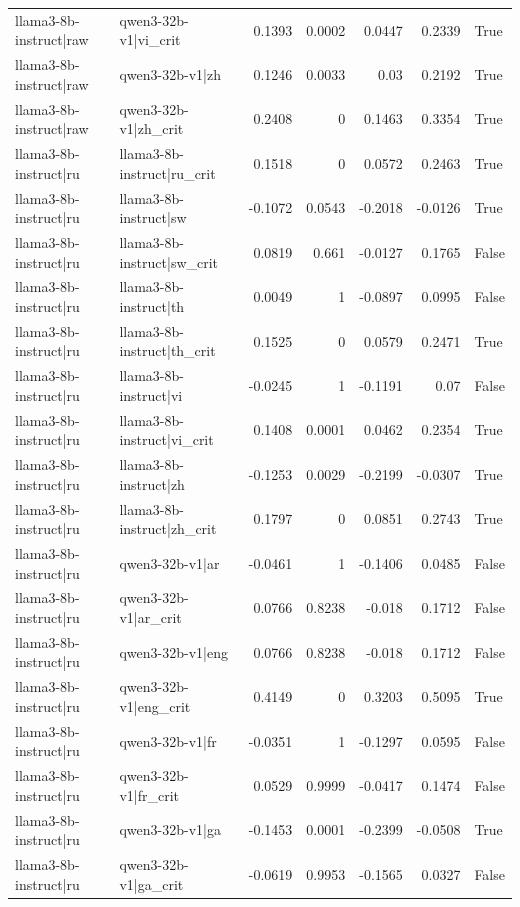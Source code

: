 \begin{table}
\begin{tabular}{l l r r r r l}
llama3-8b-instruct|raw & qwen3-32b-v1|vi_crit & 0.1393 & 0.0002 & 0.0447 & 0.2339 & True \\
llama3-8b-instruct|raw & qwen3-32b-v1|zh & 0.1246 & 0.0033 & 0.03 & 0.2192 & True \\
llama3-8b-instruct|raw & qwen3-32b-v1|zh_crit & 0.2408 & 0 & 0.1463 & 0.3354 & True \\
llama3-8b-instruct|ru & llama3-8b-instruct|ru_crit & 0.1518 & 0 & 0.0572 & 0.2463 & True \\
llama3-8b-instruct|ru & llama3-8b-instruct|sw & -0.1072 & 0.0543 & -0.2018 & -0.0126 & True \\
llama3-8b-instruct|ru & llama3-8b-instruct|sw_crit & 0.0819 & 0.661 & -0.0127 & 0.1765 & False \\
llama3-8b-instruct|ru & llama3-8b-instruct|th & 0.0049 & 1 & -0.0897 & 0.0995 & False \\
llama3-8b-instruct|ru & llama3-8b-instruct|th_crit & 0.1525 & 0 & 0.0579 & 0.2471 & True \\
llama3-8b-instruct|ru & llama3-8b-instruct|vi & -0.0245 & 1 & -0.1191 & 0.07 & False \\
llama3-8b-instruct|ru & llama3-8b-instruct|vi_crit & 0.1408 & 0.0001 & 0.0462 & 0.2354 & True \\
llama3-8b-instruct|ru & llama3-8b-instruct|zh & -0.1253 & 0.0029 & -0.2199 & -0.0307 & True \\
llama3-8b-instruct|ru & llama3-8b-instruct|zh_crit & 0.1797 & 0 & 0.0851 & 0.2743 & True \\
llama3-8b-instruct|ru & qwen3-32b-v1|ar & -0.0461 & 1 & -0.1406 & 0.0485 & False \\
llama3-8b-instruct|ru & qwen3-32b-v1|ar_crit & 0.0766 & 0.8238 & -0.018 & 0.1712 & False \\
llama3-8b-instruct|ru & qwen3-32b-v1|eng & 0.0766 & 0.8238 & -0.018 & 0.1712 & False \\
llama3-8b-instruct|ru & qwen3-32b-v1|eng_crit & 0.4149 & 0 & 0.3203 & 0.5095 & True \\
llama3-8b-instruct|ru & qwen3-32b-v1|fr & -0.0351 & 1 & -0.1297 & 0.0595 & False \\
llama3-8b-instruct|ru & qwen3-32b-v1|fr_crit & 0.0529 & 0.9999 & -0.0417 & 0.1474 & False \\
llama3-8b-instruct|ru & qwen3-32b-v1|ga & -0.1453 & 0.0001 & -0.2399 & -0.0508 & True \\
llama3-8b-instruct|ru & qwen3-32b-v1|ga_crit & -0.0619 & 0.9953 & -0.1565 & 0.0327 & False \\

\end{tabular}
\end{table}

